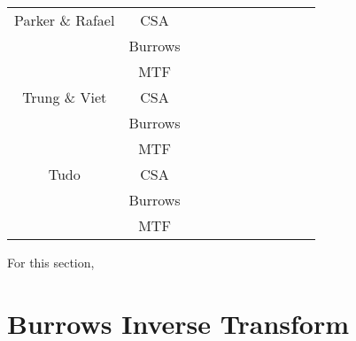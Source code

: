 \documentclass[12pt]{article}
\begin{document}
\begin{table}[H]
{\begin{tabular}{c|c|ccccccccc}
		Parker \& Rafael     & CSA      &  &  &  &  &  &  &  &  &   \\
                             & Burrows  &  &  &  &  &  &  &  &  &   \\
                             & MTF      &  &  &  &  &  &  &  &  &   \\ \hline

		Trung \& Viet        & CSA      &  &  &  &  &  &  &  &  &   \\
                             & Burrows  &  &  &  &  &  &  &  &  &   \\
                             & MTF      &  &  &  &  &  &  &  &  &   \\ \hline

        Tudo                 & CSA      &  &  &  &  &  &  &  &  &   \\
                             & Burrows  &  &  &  &  &  &  &  &  &   \\
                             & MTF      &  &  &  &  &  &  &  &  &   \\ \hline
		\bottomrule
	\end{tabular}}
\end{table}
For this section,

\section{Burrows Inverse Transform}
\end{document}
